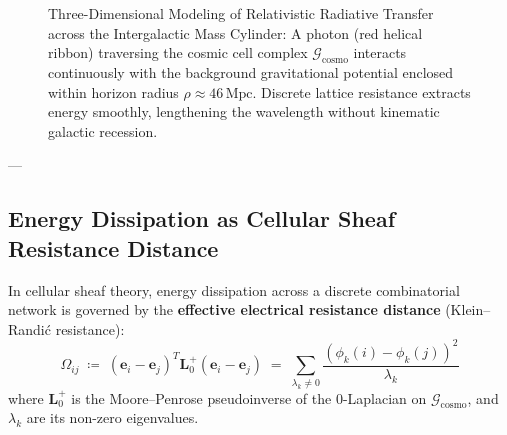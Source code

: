 \documentclass[
    12pt,
    a4paper,
    headings=normal,
    twoside=false,
    open=any,
    parskip=half
]{scrbook}
\newcommand{\diff}{\mathop{}\!\mathrm{d}}
\begin{document}
\begin{figure}[htbp]
\caption{Three-Dimensional Modeling of Relativistic Radiative Transfer across the Intergalactic Mass Cylinder: A photon (red helical ribbon) traversing the cosmic cell complex $\mathcal{G}_{\text{cosmo}}$ interacts continuously with the background gravitational potential enclosed within horizon radius $\rho \approx 46\,\text{Mpc}$. Discrete lattice resistance extracts energy smoothly, lengthening the wavelength without kinematic galactic recession.}
\label{fig:ch7_mass_cylinder_drag_3d}
\end{figure}

---

\subsection{Energy Dissipation as Cellular Sheaf Resistance Distance}

In cellular sheaf theory, energy dissipation across a discrete combinatorial network is governed by the \textbf{effective electrical resistance distance} (Klein--Randić resistance):
\begin{equation}
\Omega_{ij} \;\coloneqq\; \left( \mathbf{e}_i - \mathbf{e}_j \right)^T \mathbf{L}_0^+ \left( \mathbf{e}_i - \mathbf{e}_j \right) \;=\; \sum_{\lambda_k \ne 0} \frac{\left( \phi_k(i) - \phi_k(j) \right)^2}{\lambda_k}
\label{eq:ch7_klein_randic_resistance}
\end{equation}
where $\mathbf{L}_0^+$ is the Moore--Penrose pseudoinverse of the 0-Laplacian on $\mathcal{G}_{\text{cosmo}}$, and $\lambda_k$ are its non-zero eigenvalues.
\end{document}
